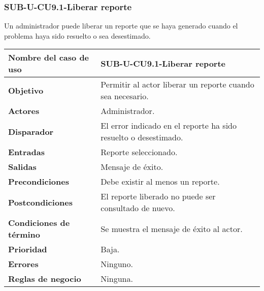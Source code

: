 \subsubsection{SUB-U-CU9.1-Liberar reporte}\label{SUB-U-CU9.1}
Un administrador puede liberar un reporte que se haya generado cuando el problema haya sido resuelto o sea desestimado.

\begin{longtable}{|J{5cm}|J{10.3cm}|}
	\hline
	\textbf{Nombre del caso de uso} &
		SUB-U-CU9.1-Liberar reporte \\ \hline
	\textbf{Objetivo} &
		Permitir al actor liberar un reporte cuando sea necesario. \\ \hline
	\textbf{Actores} &
		Administrador. \\ \hline 
	\textbf{Disparador} & 
		El error indicado en el reporte ha sido resuelto o desestimado. \\ \hline 
	\textbf{Entradas} & Reporte seleccionado.
		\\ \hline 
	\textbf{Salidas} & Mensaje de éxito.
		\\ \hline
	\textbf{Precondiciones} &
		Debe existir al menos un reporte.\\ \hline
	\textbf{Postcondiciones} & El reporte liberado no puede ser consultado de nuevo.
		\\ \hline
	\textbf{Condiciones de término} & Se muestra el mensaje de éxito al actor.
		\\ \hline 
	\textbf{Prioridad} & 
		Baja. \\ \hline
	\textbf{Errores} & Ninguno.
		\\ \hline
	\textbf{Reglas de negocio} & Ninguna.
		 \\ \hline
\end{longtable}

